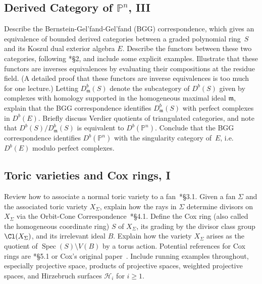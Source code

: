 \documentclass[11pt]{amsart}
\numberwithin{equation}{section}
\theoremstyle{definition}
\theoremstyle{remark}
\newcommand{\m}{\mathfrak m}
\newcommand{\PP}{\mathbb P}
\newcommand{\Spec}{\operatorname{Spec}}
\begin{document}
\subsection{Derived Category of $\PP^n$, III}
\label{sec:pn3}
Describe the Bernstein-Gel'fand-Gel'fand (BGG) correspondence, which gives an equivalence of bounded derived categories between a graded polynomial ring~$S$ and its Koszul dual exterior algebra $E$. Describe the functors between these two categories, following \cite{EFS}*{\S 2}, and include some explicit examples. Illustrate that these functors are inverses equivalences by evaluating their compositions at the residue field. (A detailed proof that these functors are inverse equivalences is too much for one lecture.) Letting $D^b_\m(S)$ denote the subcategory of $D^b(S)$ given by complexes with homology supported in the homogeneous maximal ideal $\m$, explain that the BGG correspondence identifies $D^b_\m(S)$  with perfect complexes in $D^b(E)$. Briefly discuss Verdier quotients of triangulated categories, and note that $D^b(S) / D^b_\m(S)$ is equivalent to $D^b(\PP^n)$. Conclude that the BGG correspondence identifies $D^b(\PP^n)$ with the singularity category of~$E$, i.e. $D^b(E)$ modulo perfect complexes. 



\subsection{Toric varieties and Cox rings, I}
Review how to associate a normal toric variety to a fan~\cite{CLS}*{\S 3.1}. Given a fan $\Sigma$ and the associated toric variety $X_\Sigma$, explain how the rays in $\Sigma$ determine divisors on $X_\Sigma$ via the Orbit-Cone Correspondence~\cite{CLS}*{\S 4.1}. Define the Cox ring (also called the homogeneous coordinate ring) $S$ of $X_\Sigma$, its grading by the divisor class group $\Cl(X_\Sigma)$, and its irrelevant ideal $B$. Explain how the variety $X_\Sigma$ arises as the quotient of $\Spec(S) \setminus V(B)$ by a torus action. Potential references for Cox rings are \cite{CLS}*{\S 5.1} or Cox's original paper~\cite{cox}. Include running examples throughout, especially projective space, products of projective spaces, weighted projective spaces, and Hirzebruch surfaces $\mathcal{H}_i$ for $i \ge 1$. 


\end{document}

